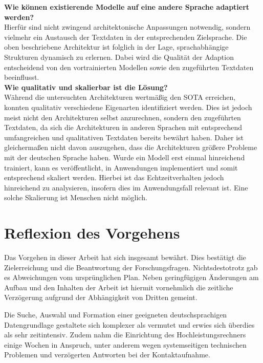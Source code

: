 \noindent
\textbf{Wie können existierende Modelle auf eine andere Sprache adaptiert werden?}\\
\noindent
Hierfür sind nicht zwingend architektonische Anpassungen notwendig, sondern vielmehr ein Austausch der Textdaten in der entsprechenden Zielsprache. Die oben beschriebene Architektur ist folglich in der Lage, sprachabhängige Strukturen dynamisch zu erlernen. Dabei wird die Qualität der Adaption entscheidend von den vortrainierten Modellen sowie den zugeführten Textdaten beeinflusst.\\

\noindent
\textbf{Wie qualitativ und skalierbar ist die Lösung?}\\
\noindent
Während die untersuchten Architekturen wertmäßig den \ac{SOTA} erreichen, konnten qualitativ verschiedene Eigenarten identifiziert werden. Dies ist jedoch meist nicht den Architekturen selbst anzurechnen, sondern den zugeführten Textdaten, da sich die Architekturen in anderen Sprachen mit entsprechend umfangreichen und qualitativen Textdaten bereits bewährt haben. Daher ist gleichermaßen nicht davon auszugehen, dass die Architekturen größere Probleme mit der deutschen Sprache haben. Wurde ein Modell erst einmal hinreichend trainiert, kann es veröffentlicht, in Anwendungen implementiert und somit entsprechend skaliert werden. Hierbei ist das Echtzeitverhalten jedoch hinreichend zu analysieren, insofern dies im Anwendungsfall relevant ist. Eine solche Skalierung ist Menschen nicht möglich.


\section{Reflexion des Vorgehens}
\noindent
Das Vorgehen in dieser Arbeit hat sich insgesamt bewährt. Dies bestätigt die Zielerreichung und die Beantwortung der Forschungsfragen. Nichtsdestotrotz gab es Abweichungen vom ursprünglichen Plan. Neben geringfügigen Änderungen am Aufbau und den Inhalten der Arbeit ist hiermit vornehmlich die zeitliche Verzögerung aufgrund der Abhängigkeit von Dritten gemeint.
\newpage

\noindent
Die Suche, Auswahl und Formation einer geeigneten deutschsprachigen Datengrundlage gestaltete sich komplexer als vermutet und erwies sich überdies als sehr zeitintensiv. Zudem nahm die Einrichtung des Hochleistungsrechners einige Wochen in Anspruch, unter anderem wegen systemseitigen technischen Problemen und verzögerten Antworten bei der Kontaktaufnahme.


